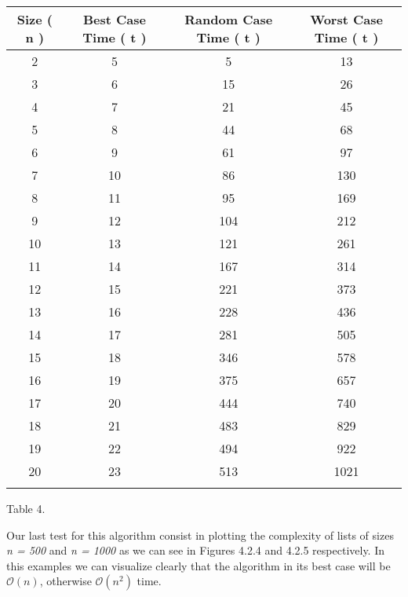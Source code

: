 {\small
\begin{center} 
\begin{tabular}[.5cm]{ c c c c } 
\toprule \toprule
\hspace {5px} Size ( n ) \hspace {5px} & \hspace {15px} Best Case Time ( t ) \hspace {15px} & \hspace {15px} Random Case Time ( t ) \hspace {15px} & \hspace {15px} Worst Case Time ( t ) \hspace {15px} \\ 
\midrule \midrule
2 & 5 & 5 & 13 \\ 
\cmidrule {1-4} 
3 & 6 & 15 & 26 \\ 
\cmidrule {1-4} 
4 & 7 & 21 & 45 \\ 
\cmidrule {1-4} 
5 & 8 & 44 & 68 \\ 
\cmidrule {1-4} 
6 & 9 & 61 & 97 \\ 
\cmidrule {1-4} 
7 & 10 & 86 & 130 \\ 
\cmidrule {1-4} 
8 & 11 & 95 & 169 \\ 
\cmidrule {1-4} 
9 & 12 & 104 & 212 \\ 
\cmidrule {1-4} 
10 & 13 & 121 & 261 \\ 
\cmidrule {1-4} 
11 & 14 & 167 & 314 \\ 
\cmidrule {1-4} 
12 & 15 & 221 & 373 \\ 
\cmidrule {1-4} 
13 & 16 & 228 & 436 \\ 
\cmidrule {1-4} 
14 & 17 & 281 & 505 \\ 
\cmidrule {1-4} 
15 & 18 & 346 & 578 \\ 
\cmidrule {1-4} 
16 & 19 & 375 & 657 \\ 
\cmidrule {1-4} 
17 & 20 & 444 & 740 \\ 
\cmidrule {1-4} 
18 & 21 & 483 & 829 \\ 
\cmidrule {1-4} 
19 & 22 & 494 & 922 \\ 
\cmidrule {1-4} 
20 & 23 & 513 & 1021 \\ 
\bottomrule 
\linebreak 
\end{tabular} 
\linebreak \linebreak Table 4.
\end{center}}

\pagebreak

Our last test for this algorithm consist in plotting the complexity of lists of sizes {\itshape n = 500} and {\itshape n = 1000} as we can see in Figures 4.2.4 and 4.2.5 respectively. In this examples we can visualize clearly that the algorithm in its best case will be {\bfseries $\mathcal{O}(n)$}, otherwise {\bfseries $\mathcal{O}(n^{2})$} time. \hfill \break

